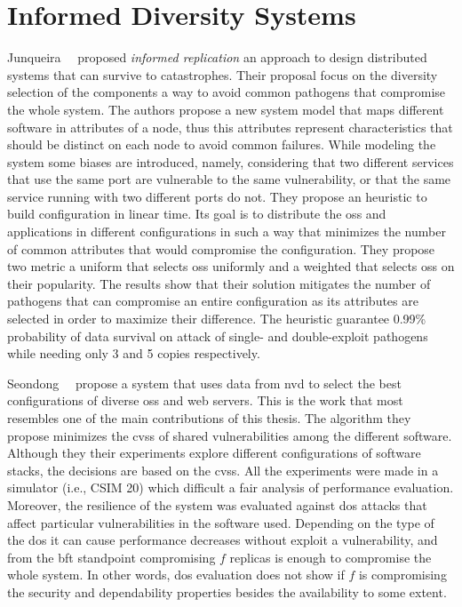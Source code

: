 \section{Informed Diversity Systems}

Junqueira~\etal{}~\cite{Junqueira:2005} proposed \emph{informed replication} an approach to design distributed systems that can survive to catastrophes.
Their proposal focus on the diversity selection of the components a way to avoid common pathogens that compromise the whole system.
The authors propose a new system model that maps different software in attributes of a node, thus this attributes represent characteristics that should be distinct on each node to avoid common failures.
While modeling the system some biases are introduced, namely, considering that two different services that use the same port are vulnerable to the same vulnerability, or that the same service running with two different ports do not.
They propose an heuristic to build configuration in linear time.
Its goal is to distribute the \glspl{os} and applications in different configurations in such a way that minimizes the number of common attributes that would compromise the configuration.
They propose two metric a uniform that selects \glspl{os} uniformly and a weighted that selects \glspl{os} on their popularity.
The results show that their solution mitigates the number of pathogens that can compromise an entire configuration as its attributes are selected in order to maximize their difference.
The heuristic guarantee 0.99\% probability of data survival on attack of single- and double-exploit pathogens while needing only 3 and 5 copies respectively.



Seondong~\etal{}~\cite{Seondong:2017} propose a system that uses data from \gls{nvd} to select the best configurations of diverse \glspl{os} and web servers.
This is the work that most resembles one of the main contributions of this thesis. 
The algorithm they propose minimizes the \gls{cvss} of shared vulnerabilities among the different software.
Although they their experiments explore different configurations of software stacks, the decisions are based on the \gls{cvss}.
All the experiments were made in a simulator (i.e., CSIM 20) which difficult a fair analysis of performance evaluation. 
Moreover, the resilience of the system was evaluated against \gls{dos} attacks that affect particular vulnerabilities in the software used.
Depending on the type of the \gls{dos} it can cause performance decreases without exploit a vulnerability, and from the \gls{bft} standpoint compromising $f$ replicas is enough to compromise the whole system.
In other words, \gls{dos} evaluation does not show if $f$ is compromising the security and dependability properties besides the availability to some extent. 



